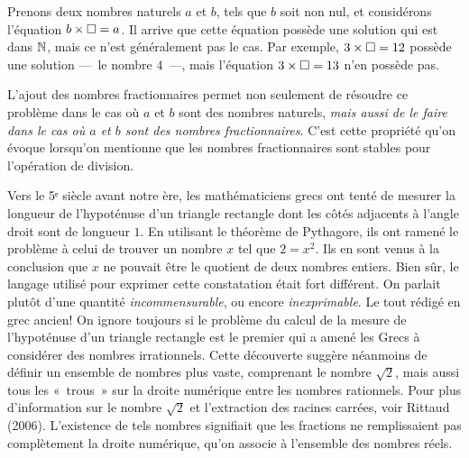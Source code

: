 \documentclass[
  letterpaper,
  DIV=11,
  numbers=noendperiod,
  oneside]{scrreprt}
\theoremstyle{definition}
\theoremstyle{remark}
\begin{document}
Prenons deux nombres naturels \(a\) et \(b\), tels que \(b\) soit non
nul, et considérons l'équation \(b\times \square = a\). Il arrive que
cette équation possède une solution qui est dans \(\mathbb{N}\), mais ce n'est
généralement pas le cas. Par exemple, \(3\times \square = 12\)
possède une solution ---~le nombre \(4\)~---, mais l'équation
\(3\times \square = 13\) n'en possède pas.


L'ajout des nombres fractionnaires permet non seulement de résoudre ce
problème dans le cas où \(a\) et \(b\) sont des nombres naturels,
\emph{mais aussi de le faire dans le cas où \(a\) et \(b\) sont des
nombres fractionnaires}. C'est cette propriété qu'on évoque lorsqu'on
mentionne que les nombres fractionnaires sont stables pour l'opération
de division.

Vers le 5ᵉ siècle avant notre ère, les mathématiciens grecs ont tenté de
mesurer la longueur de l'hypoténuse d'un triangle rectangle dont les
côtés adjacents à l'angle droit sont de longueur \(1\). En utilisant le
théorème de Pythagore, ils ont ramené le problème à celui de trouver un
nombre \(x\) tel que \(2=x^2\). Ils en sont venus à la conclusion que
\(x\) ne pouvait être le quotient de deux nombres entiers. Bien sûr, le
langage utilisé pour exprimer cette constatation était fort différent.
On parlait plutôt d'une quantité \emph{incommensurable}, ou encore
\emph{inexprimable}. Le tout rédigé en grec ancien! On ignore toujours
si le problème du calcul de la mesure de l'hypoténuse d'un triangle
rectangle est le premier qui a amené les Grecs à considérer des nombres
irrationnels. Cette découverte suggère néanmoins de définir un ensemble
de nombres plus vaste, comprenant le nombre \(\sqrt{2}\), mais aussi
tous les «~trous~» sur la droite numérique entre les nombres rationnels.
Pour plus d'information sur le nombre \(\sqrt{2}\) et l'extraction des
racines carrées, voir Rittaud (2006). L'existence de tels nombres
signifiait que les fractions ne remplissaient pas complètement la droite
numérique, qu'on associe à l'ensemble des nombres réels.
\end{document}
